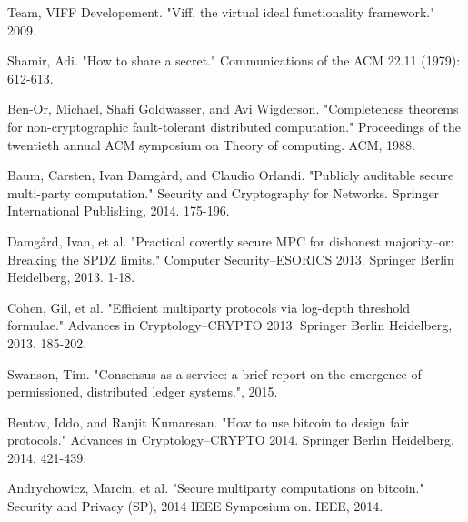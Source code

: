 \documentclass{article} \usepackage{nips13submit_e,times}
\begin{document}
\begin{thebibliography}{56}
Team, VIFF Developement. "Viff, the virtual ideal functionality framework." 2009.

Shamir, Adi. "How to share a secret." Communications of the ACM 22.11 (1979): 612-613.

Ben-Or, Michael, Shafi Goldwasser, and Avi Wigderson. "Completeness theorems for non-cryptographic fault-tolerant distributed computation." Proceedings of the twentieth annual ACM symposium on Theory of computing. ACM, 1988.

Baum, Carsten, Ivan Damgård, and Claudio Orlandi. "Publicly auditable secure multi-party computation." Security and Cryptography for Networks. Springer International Publishing, 2014. 175-196.

Damgård, Ivan, et al. "Practical covertly secure MPC for dishonest majority–or: Breaking the SPDZ limits." Computer Security–ESORICS 2013. Springer Berlin Heidelberg, 2013. 1-18.

Cohen, Gil, et al. "Efficient multiparty protocols via log-depth threshold formulae." Advances in Cryptology–CRYPTO 2013. Springer Berlin Heidelberg, 2013. 185-202.

Swanson, Tim. "Consensus-as-a-service: a brief report on the emergence of permissioned, distributed ledger systems.", 2015.

Bentov, Iddo, and Ranjit Kumaresan. "How to use bitcoin to design fair protocols." Advances in Cryptology–CRYPTO 2014. Springer Berlin Heidelberg, 2014. 421-439.

Andrychowicz, Marcin, et al. "Secure multiparty computations on bitcoin." Security and Privacy (SP), 2014 IEEE Symposium on. IEEE, 2014.


\end{thebibliography}
\end{document}
